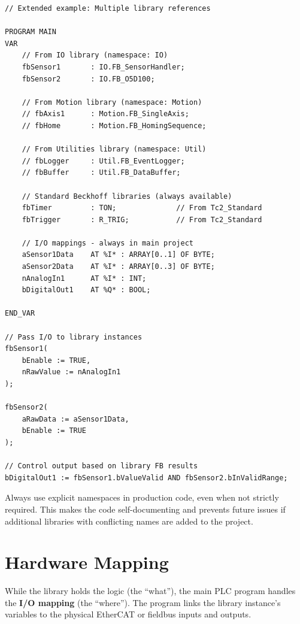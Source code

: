 \documentclass[11pt,a4paper]{article}
\begin{document}
\begin{lstlisting}
// Extended example: Multiple library references

PROGRAM MAIN
VAR
    // From IO library (namespace: IO)
    fbSensor1       : IO.FB_SensorHandler;
    fbSensor2       : IO.FB_O5D100;
    
    // From Motion library (namespace: Motion)
    // fbAxis1      : Motion.FB_SingleAxis;
    // fbHome       : Motion.FB_HomingSequence;
    
    // From Utilities library (namespace: Util)
    // fbLogger     : Util.FB_EventLogger;
    // fbBuffer     : Util.FB_DataBuffer;
    
    // Standard Beckhoff libraries (always available)
    fbTimer         : TON;              // From Tc2_Standard
    fbTrigger       : R_TRIG;           // From Tc2_Standard
    
    // I/O mappings - always in main project
    aSensor1Data    AT %I* : ARRAY[0..1] OF BYTE;
    aSensor2Data    AT %I* : ARRAY[0..3] OF BYTE;
    nAnalogIn1      AT %I* : INT;
    bDigitalOut1    AT %Q* : BOOL;
    
END_VAR

// Pass I/O to library instances
fbSensor1(
    bEnable := TRUE,
    nRawValue := nAnalogIn1
);

fbSensor2(
    aRawData := aSensor1Data,
    bEnable := TRUE
);

// Control output based on library FB results
bDigitalOut1 := fbSensor1.bValueValid AND fbSensor2.bInValidRange;
\end{lstlisting}

\begin{tipbox}
Always use explicit namespaces in production code, even when not strictly required. This makes the code self-documenting and prevents future issues if additional libraries with conflicting names are added to the project.
\end{tipbox}

\section{Hardware Mapping}

While the library holds the logic (the ``what''), the main PLC program handles the \textbf{I/O mapping} (the ``where''). The program links the library instance's variables to the physical EtherCAT or fieldbus inputs and outputs.
\end{document}
